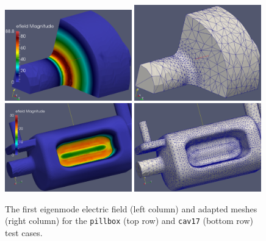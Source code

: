 \begin{figure} \centering
  \includegraphics[width=0.49\textwidth]{figures/omega3p/pillbox_al_3_ar_0p0125_14221_elems_e_field.eps}
  \includegraphics[width=0.49\textwidth]{figures/omega3p/pillbox_al_3_ar_0p0125_14221_elems_mesh.eps}
  \includegraphics[width=0.49\textwidth]{figures/omega3p/cav17_al_3_ar_0p0125_386896_elems_e_field.eps}
  \includegraphics[width=0.49\textwidth]{figures/omega3p/cav17_al_3_ar_0p0125_386896_elems_mesh.eps}
  \caption{
    The first eigenmode electric field (left column) and adapted meshes
    (right column) for the \texttt{pillbox} (top row) and \texttt{cav17}
    (bottom row) test cases.
  }
  \label{fig:omega3pAdapt}
\end{figure}

